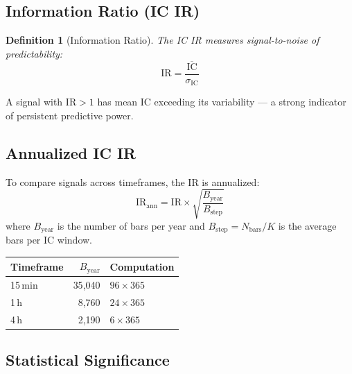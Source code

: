 \documentclass[11pt,a4paper]{article}
\newcommand{\toprule}{\hline\hline}
\newcommand{\midrule}{\hline}
\newcommand{\bottomrule}{\hline\hline}
\newtheorem{definition}{Definition}
\begin{document}
\subsection{Information Ratio (IC IR)}

\begin{definition}[Information Ratio]
The IC IR measures signal-to-noise of predictability:
\begin{equation}
    \mathrm{IR} = \frac{\overline{\mathrm{IC}}}{\sigma_{\mathrm{IC}}}
    \label{eq:ic_ir}
\end{equation}
\end{definition}

A signal with $\mathrm{IR} > 1$ has mean IC exceeding its variability ---
a strong indicator of persistent predictive power.

\subsection{Annualized IC IR}

To compare signals across timeframes, the IR is annualized:
\begin{equation}
    \mathrm{IR}_{\mathrm{ann}} = \mathrm{IR} \times
        \sqrt{\frac{B_{\mathrm{year}}}{B_{\mathrm{step}}}}
    \label{eq:ann_ir}
\end{equation}
where $B_{\mathrm{year}}$ is the number of bars per year and
$B_{\mathrm{step}} = N_{\mathrm{bars}} / K$ is the average bars per
IC window.

\begin{center}
\begin{tabular}{lrl}
    \toprule
    \textbf{Timeframe} & $B_{\mathrm{year}}$ & \textbf{Computation} \\
    \midrule
    15\,min & 35{,}040 & $96 \times 365$ \\
    1\,h    &  8{,}760 & $24 \times 365$ \\
    4\,h    &  2{,}190 & $6 \times 365$ \\
    \bottomrule
\end{tabular}
\end{center}

\subsection{Statistical Significance}
\end{document}
